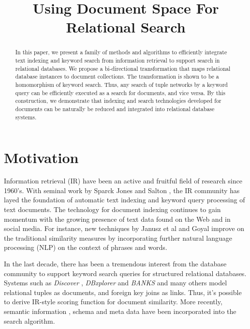 \documentclass[conference]{IEEEtran}
\begin{document}
\title{Using Document Space For Relational Search}
\author{
    \and
}
\maketitle

\begin{abstract}
In this paper, we present a family of methods and algorithms to efficiently integrate text indexing and keyword search from information retrieval to support search in relational databases.  We propose a bi-directional transformation that maps relational database instances to document collections.  The transformation is shown to be a homomorphism of keyword search.  Thus, any search of tuple networks by a keyword query can be efficiently executed as a search for documents, and vice versa.  By this construction, we demonstrate that indexing and search technologies developed for documents can be naturally be reduced and integrated into relational database systems.
\end{abstract}

\section{Motivation}

Information retrieval (IR) have been an active and fruitful field of research since 1960's.  With seminal work by Sparck Jones \cite{jones72} and Salton \cite{salton75}, the IR community has layed the foundation of automatic text indexing and keyword query processing of text documents.  The technology for document indexing continues to gain momentum with the growing presence of text data found on the Web and in social media.  For instance, new techniques by Janusz et al \cite{janu12} and Goyal \cite{goyal13} improve on the traditional similarity measures by incorporating further natural language processing (NLP) on the context of phrases and words.

In the last decade, there has been a tremendous interest from the database community to support keyword search queries for structured relational databases.  Systems such as {\em Discover} \cite{hris02}, {\em DBxplorer} \cite{agrawal2002dbxplorer} and {\em BANKS} \cite{bhalotia2002keyword} and many others \cite{hristidis2003efficient,liu2006effective} model relational tuples as documents, and foreign key joins as links.  Thus, it's possible to derive IR-style scoring function for document similarity.  More recently, semantic information \cite{zeng2013semantic}, schema and meta data \cite{bergamaschi2011keyword} have been incorporated into the search algorithm.
\end{document}
